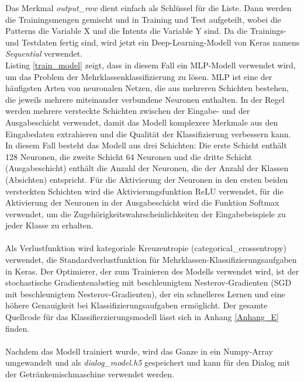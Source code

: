 Das Merkmal \textit{output\_row} dient einfach als Schlüssel für die Liste. 
Dann werden die Trainingsmengen gemischt und in Training und Test aufgeteilt, wobei die Patterns die Variable X und die Intents die Variable Y sind. 
Da die Trainings- und Testdaten fertig sind, wird jetzt ein Deep-Learning-Modell von Keras namens \textit{Sequential} verwendet.\\

Listing \ref{train_model} zeigt, dass in diesem Fall ein \ac{MLP}-Modell verwendet wird, um das Problem der Mehrklassenklassifizierung zu lösen. 
\ac{MLP} ist eine der häufigsten Arten von neuronalen Netzen, die aus mehreren Schichten bestehen, die jeweils mehrere miteinander verbundene Neuronen enthalten. 
In der Regel werden mehrere versteckte Schichten zwischen der Eingabe- und der Ausgabeschicht verwendet, damit das Modell komplexere Merkmale aus den Eingabedaten extrahieren und die Qualität der Klassifizierung verbessern kann. 
In diesem Fall besteht das Modell aus drei Schichten: Die erste Schicht enthält 128 Neuronen, die zweite Schicht 64 Neuronen und die dritte Schicht (Ausgabeschicht) enthält die Anzahl der Neuronen, die der Anzahl der Klassen (Absichten) entspricht. 
Für die Aktivierung der Neuronen in den ersten beiden versteckten Schichten wird die Aktivierungsfunktion \ac{ReLU} verwendet, für die Aktivierung der Neuronen in der Ausgabeschicht wird die Funktion Softmax verwendet, um die Zugehörigkeitswahrscheinlichkeiten der Eingabebeispiele zu jeder Klasse zu erhalten.\\\\
Als Verlustfunktion wird kategoriale Kreuzentropie (categorical\_crossentropy) verwendet, die Standardverlustfunktion für Mehrklassen-Klassifizierungsaufgaben in Keras. 
Der Optimierer, der zum Trainieren des Modells verwendet wird, ist der stochastische Gradientenabstieg mit beschleunigtem Nesterov-Gradienten (SGD mit beschleunigtem Nesterov-Gradienten), der ein schnelleres Lernen und eine höhere Genauigkeit bei Klassifizierungsaufgaben ermöglicht. 
Der gesamte Quellcode für das Klassifierzierungsmodell lässt sich in Anhang \ref{Anhang_E} finden.\\\\
Nachdem das Modell trainiert wurde, wird das Ganze in ein Numpy-Array umgewandelt und als \textit{dialog\_model.h5} gespeichert und kann für den Dialog mit der Getränkemischmaschine verwendet werden.

